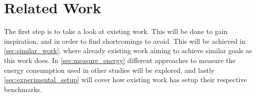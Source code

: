 \chapter{Related Work}\label{ch:related_work}

The first step is to take a look at existing work. This will be done to gain inspiration, and in order to find shortcomings to avoid. This will be achieved in \cref*{sec:similar_work}, where already existing work aiming to achieve similar goals as this work does. In \cref*{sec:measure_energy} different approaches to measure the energy consumption used in other studies will be explored, and lastly \cref*{sec:experimental_setup} will cover how existing work has setup their respective benchmarks.


% 

